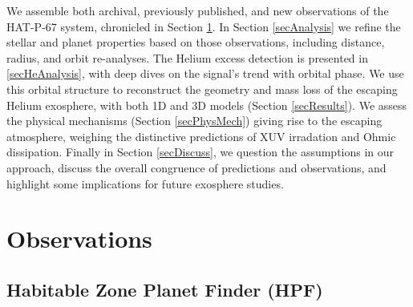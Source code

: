 \documentclass[twocolumn]{aastex631}
\begin{document}
We assemble both archival, previously published, and new observations of the HAT-P-67 system, chronicled in Section \ref{secObs}.  In Section \ref{secAnalysis} we refine the stellar and planet properties based on those observations, including distance, radius, and orbit re-analyses.  The Helium excess detection is presented in \ref{secHeAnalysis}, with deep dives on the signal's trend with orbital phase.  We use this orbital structure to reconstruct the geometry and mass loss of the escaping Helium exosphere, with both 1D and 3D models (Section \ref{secResults}).  We assess the physical mechanisms (Section \ref{secPhysMech}) giving rise to the escaping atmosphere, weighing the distinctive predictions of XUV irradation and Ohmic dissipation.  Finally in Section \ref{secDiscuss}, we question the assumptions in our approach, discuss the overall congruence of predictions and observations, and highlight some implications for future exosphere studies.


\section{Observations}\label{secObs}
\subsection{Habitable Zone Planet Finder (HPF)}
\end{document}
